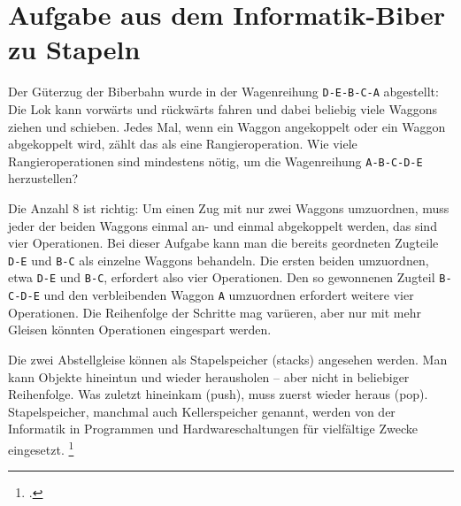\documentclass{lehramt-informatik-aufgabe}
\begin{document}

\section{Aufgabe aus dem Informatik-Biber zu Stapeln
}

Der Güterzug der Biberbahn wurde in der Wagenreihung \verb|D-E-B-C-A|
abgestellt: Die Lok kann vorwärts und rückwärts fahren und dabei
beliebig viele Waggons ziehen und schieben. Jedes Mal, wenn ein Waggon
angekoppelt oder ein Waggon abgekoppelt wird, zählt das als eine
Rangieroperation. Wie viele Rangieroperationen sind mindestens nötig, um
die Wagenreihung \verb|A-B-C-D-E| herzustellen?

Die Anzahl 8 ist richtig: Um einen Zug mit nur zwei Waggons umzuordnen,
muss jeder der beiden Waggons einmal an- und einmal abgekoppelt werden,
das sind vier Operationen. Bei dieser Aufgabe kann man die bereits
geordneten Zugteile \verb|D-E| und \verb|B-C| als einzelne Waggons
behandeln. Die ersten beiden umzuordnen, etwa \verb|D-E| und \verb|B-C|,
erfordert also vier Operationen. Den so gewonnenen Zugteil
\verb|B-C-D-E| und den verbleibenden Waggon \verb|A| umzuordnen
erfordert weitere vier Operationen. Die Reihenfolge der Schritte mag
varüeren, aber nur mit mehr Gleisen könnten Operationen eingespart
werden.

Die zwei Abstellgleise können als Stapelspeicher (stacks) angesehen
werden. Man kann Objekte hineintun und wieder herausholen – aber nicht
in beliebiger Reihenfolge. Was zuletzt hineinkam (push), muss zuerst
wieder heraus (pop). Stapelspeicher, manchmal auch Kellerspeicher
genannt, werden von der Informatik in Programmen und Hardwareschaltungen
für vielfältige Zwecke eingesetzt.
\footcite[Seite 23]{net:pdf:informatik-biber-2012}
\end{document}
